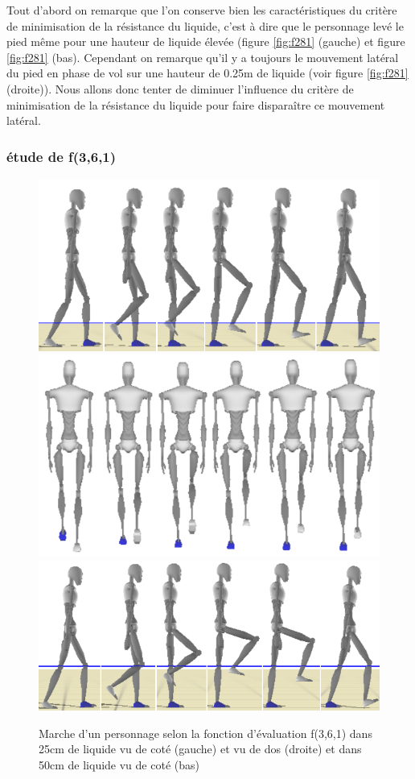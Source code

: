\documentclass[runningheads,a4paper]{llncs}
\begin{document}
Tout d'abord on remarque que l'on conserve bien les caractéristiques du critère de minimisation de la résistance du liquide, c'est à dire que le personnage levé le pied même pour une hauteur de liquide élevée (figure \ref{fig:f281} (gauche) et figure \ref{fig:f281} (bas). Cependant on remarque qu'il y a toujours le mouvement latéral du pied en phase de vol sur une hauteur de 0.25m de liquide (voir figure \ref{fig:f281} (droite)). Nous allons donc tenter de diminuer l'influence du critère de minimisation de la résistance du liquide pour faire disparaître ce mouvement latéral.

\subsubsection{étude de f(3,6,1)}
\begin{figure}[h]
\centering
\includegraphics[scale=0.35]{strips/3_6_1_25cm.png}
\includegraphics[scale=0.35]{strips/3_6_1_25cm_from_back.png}
\includegraphics[scale=0.4]{strips/3_6_1_50cm.png}
\caption{Marche d'un personnage selon la fonction d'évaluation f(3,6,1) dans 25cm de liquide vu de coté (gauche) et vu de dos (droite) et dans 50cm de liquide vu de coté (bas)}
\label{fig:f361}
\end{figure}
\end{document}
